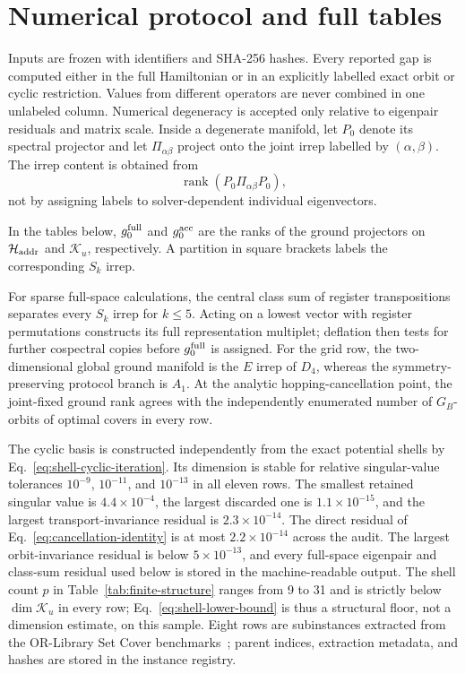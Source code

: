 \section{Numerical protocol and full tables}
\label{app:numerical-protocol}

Inputs are frozen with identifiers and SHA-256 hashes.  Every reported gap
is computed either in the full Hamiltonian or in an explicitly labelled
exact orbit or cyclic restriction.  Values from different operators are
never combined in one unlabeled column.  Numerical degeneracy is accepted
only relative to eigenpair residuals and matrix scale.  Inside a degenerate
manifold, let $P_0$ denote its spectral projector and let
$\Pi_{\alpha\beta}$ project onto the joint irrep labelled by
$(\alpha,\beta)$.  The irrep content is obtained from
\begin{equation}
 \operatorname{rank}(P_0\Pi_{\alpha\beta}P_0),
\end{equation}
not by assigning labels to solver-dependent individual eigenvectors.

In the tables below, $g_0^{\rm full}$ and $g_0^{\rm acc}$ are the ranks of
the ground projectors on $\mathcal H_{\rm addr}$ and $\mathcal K_u$,
respectively.  A partition in square brackets labels the corresponding
$S_k$ irrep.

For sparse full-space calculations, the central class sum of register
transpositions separates every $S_k$ irrep for $k\leq5$.  Acting on a
lowest vector with register permutations constructs its full representation
multiplet; deflation then tests
for further cospectral copies before $g_0^{\rm full}$ is assigned.  For the
grid row, the two-dimensional global ground manifold is the $E$ irrep of
$D_4$, whereas the symmetry-preserving protocol branch is $A_1$.  At the analytic
hopping-cancellation point, the joint-fixed ground rank agrees with the
independently enumerated number of $G_B$-orbits of optimal covers in every
row.

The cyclic basis is constructed independently from the exact potential
shells by Eq.~\eqref{eq:shell-cyclic-iteration}.  Its dimension is stable
for relative singular-value tolerances $10^{-9}$, $10^{-11}$, and
$10^{-13}$ in all eleven rows.  The smallest retained singular value is
$4.4\times10^{-4}$, the largest discarded one is
$1.1\times10^{-15}$, and the largest transport-invariance residual is
$2.3\times10^{-14}$.  The direct residual of
Eq.~\eqref{eq:cancellation-identity} is at most $2.2\times10^{-14}$ across
the audit.  The largest orbit-invariance residual is below
$5\times10^{-13}$, and every
full-space eigenpair and class-sum residual used below is stored in the
machine-readable output.  The shell count $p$ in
Table~\ref{tab:finite-structure} ranges from 9 to 31 and is strictly below
$\dim\mathcal K_u$ in every row; Eq.~\eqref{eq:shell-lower-bound} is thus a
structural floor, not a dimension estimate, on this sample.  Eight rows are
subinstances extracted from the OR-Library Set Cover
benchmarks~\cite{Beasley1990,ORLib}; parent indices, extraction metadata, and
hashes are stored in the instance registry.

